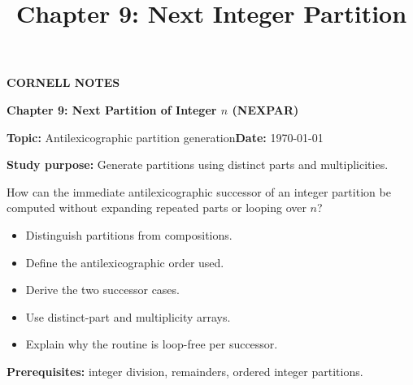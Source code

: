 \documentclass[10pt,letterpaper]{article}
\title{Chapter 9: Next Integer Partition}
\author{}
\date{}
\begin{document}
\maketitle
\begin{tcolorbox}[colback=Paper,colframe=Ink]{\small\bfseries\color{Teal}CORNELL NOTES}\par{\LARGE\bfseries Chapter 9: Next Partition of Integer $n$ (NEXPAR)}\par\medskip\textbf{Topic:} Antilexicographic partition generation\hfill\textbf{Date:} \today\par\textbf{Study purpose:} Generate partitions using distinct parts and multiplicities.\end{tcolorbox}
\begin{tcolorbox}[colback=Teal!5,colframe=Teal,title=Essential question]How can the immediate antilexicographic successor of an integer partition be computed without expanding repeated parts or looping over $n$?\end{tcolorbox}
\begin{tcolorbox}[colback=white,colframe=Mist,title=Learning objectives]\begin{itemize}\item Distinguish partitions from compositions.\item Define the antilexicographic order used.\item Derive the two successor cases.\item Use distinct-part and multiplicity arrays.\item Explain why the routine is loop-free per successor.\end{itemize}\textbf{Prerequisites:} integer division, remainders, ordered integer partitions.\end{tcolorbox}
\end{document}
